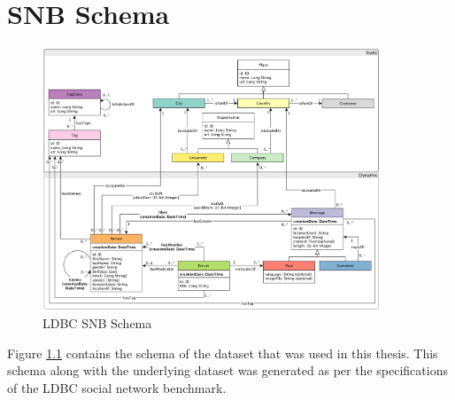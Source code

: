 \chapter{SNB Schema} \label{sec:schema}
\begin{figure}[ht]
    \centering
    \includegraphics[width=0.9\textwidth]{figures/LDBC-Schema}
    \caption{LDBC SNB Schema}
    \label{fig:ldbcSchema}
\end{figure}
Figure \ref{fig:ldbcSchema} contains the schema of the dataset that was used in
this thesis. This schema along with the underlying dataset was generated as per
the specifications of the LDBC social network benchmark\cite{angles2020ldbc}.
